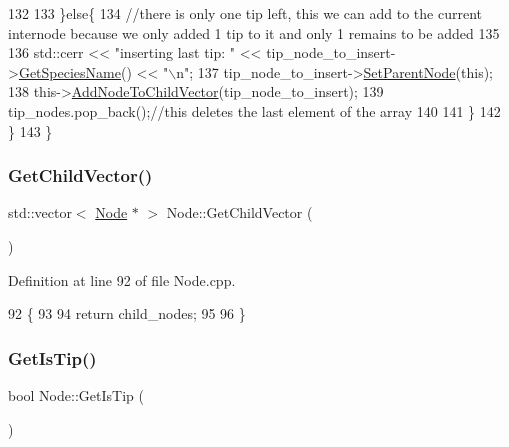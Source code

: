 \begin{DoxyCode}
132       
133     \}\textcolor{keywordflow}{else}\{
134       \textcolor{comment}{//there is only one tip left, this we can add to the current internode because we only added 1 tip to
       it and only 1 remains to be added}
135       
136       std::cerr << \textcolor{stringliteral}{"inserting last tip: "} << tip\_node\_to\_insert->\hyperlink{classNode_a9787fabf589f2b0764482b41091f775b}{GetSpeciesName}() << \textcolor{stringliteral}{"\(\backslash\)n"};
137       tip\_node\_to\_insert->\hyperlink{classNode_acb22b8f28ca70e1316a6bafc375ee352}{SetParentNode}(\textcolor{keyword}{this});
138       this->\hyperlink{classNode_aef73af92aa3046218f83ed67a7996188}{AddNodeToChildVector}(tip\_node\_to\_insert);
139       tip\_nodes.pop\_back();\textcolor{comment}{//this deletes the last element of the array}
140       
141     \}
142   \}
143 \}
\end{DoxyCode}
\mbox{\label{classNode_a9b9823315fd95dcd24aac97316de2859}} 
\subsubsection{\texorpdfstring{Get\+Child\+Vector()}{GetChildVector()}}
{\footnotesize\ttfamily std\+::vector$<$ \hyperlink{classNode}{Node} $\ast$ $>$ Node\+::\+Get\+Child\+Vector (\begin{DoxyParamCaption}{ }\end{DoxyParamCaption})}



Definition at line 92 of file Node.\+cpp.


\begin{DoxyCode}
92                                      \{
93   
94   \textcolor{keywordflow}{return} child\_nodes;
95   
96 \}
\end{DoxyCode}
\mbox{\label{classNode_ac2902fa01a9ebbeb692fe16d75bd6be2}} 
\subsubsection{\texorpdfstring{Get\+Is\+Tip()}{GetIsTip()}}
{\footnotesize\ttfamily bool Node\+::\+Get\+Is\+Tip (\begin{DoxyParamCaption}{ }\end{DoxyParamCaption})}



